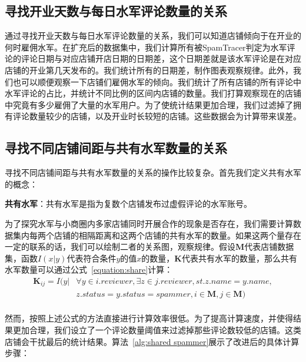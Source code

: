 \subsection{寻找开业天数与每日水军评论数量的关系}

通过寻找开业天数与每日水军评论数量的关系，我们可以知道店铺倾向于在开业的何时雇佣水军。在扩充后的数据集中，我们计算所有被SpamTracer判定为水军评论的评论日期与对应店铺开店日期的日期差，这个日期差就是该水军评论是在对应店铺的开业第几天发布的。我们统计所有的日期差，制作图表观察规律。此外，我们也可以顺便观察一下店铺们雇佣水军的倾向。我们统计了所有店铺的所有评论中水军评论的占比，并统计不同比例的区间内店铺的数量。我们打算观察现在的店铺中究竟有多少雇佣了大量的水军用户。为了使统计结果更加合理，我们过滤掉了拥有评论数量较少的店铺，以及开业时长较短的店铺。这些数据会为计算带来误差。



\subsection{寻找不同店铺间距与共有水军数量的关系}

寻找不同店铺间距与共有水军数量的关系的操作比较复杂。首先我们定义共有水军的概念：

\begin{defn}
	\textbf{共有水军}：共有水军是指为复数个店铺发布过虚假评论的水军账号。
\end{defn}

为了探究水军与小商圈内多家店铺同时开展合作的现象是否存在，我们需要计算数据集内每两个店铺的相隔距离和这两个店铺的共有水军的数量。如果这两个量存在一定的联系的话，我们可以绘制二者的关系图，观察规律。假设$\mathbf{M}$代表店铺数据集，函数$I(x|y)$代表符合条件$y$的值$x$的数量，$\mathbf{K}$代表共有水军的数量，那么共有水军数量可以通过公式~\eqref{equation:share}计算：
\begin{equation}
\label{equation:share}
\begin{aligned}
\mathbf{K}_{ij} = I(y| &\forall y \in i.reviewer, \exists z \in j.reviewer, st. z.name = y.name, \\
&z.status = y.status = spammer, i \in \mathbf{M}, j \in \mathbf{M})\\
\end{aligned}
\end{equation}

然而，按照上述公式的方法直接进行计算效率很低。为了提高计算速度，并使得结果更加合理，我们设立了一个评论数量阈值来过滤掉那些评论数较低的店铺。这类店铺会干扰最后的统计结果。算法~\ref{alg:shared spammer}展示了改进后的具体计算步骤：


